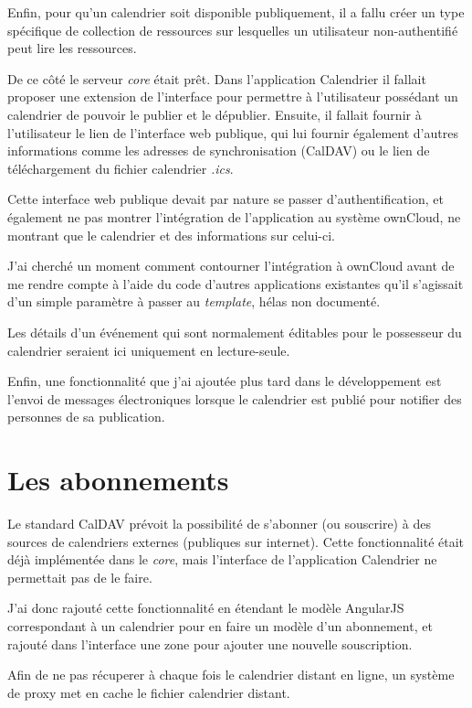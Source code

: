 \documentclass[10pt,a4paper]{report}
\begin{document}
	Enfin, pour qu'un calendrier soit disponible publiquement, il a fallu créer un type spécifique de collection de ressources sur lesquelles un utilisateur non-authentifié peut lire les ressources.
	
	De ce côté le serveur \textit{core} était prêt. Dans l'application Calendrier il fallait proposer une extension de l'interface pour permettre à l'utilisateur possédant un calendrier de pouvoir le publier et le dépublier. Ensuite, il fallait fournir à l'utilisateur le lien de l'interface web publique, qui lui fournir également d'autres informations comme les adresses de synchronisation (CalDAV) ou le lien de téléchargement du fichier calendrier \textit{.ics}.
	
	Cette interface web publique devait par nature se passer d'authentification, et également ne pas montrer l'intégration de l'application au système ownCloud, ne montrant que le calendrier et des informations sur celui-ci.
	
	J'ai cherché un moment comment contourner l'intégration à ownCloud avant de me rendre compte à l'aide du code d'autres applications existantes qu'il s'agissait d'un simple paramètre à passer au \textit{template}, hélas non documenté.
	
	Les détails d'un événement qui sont normalement éditables pour le possesseur du calendrier seraient ici uniquement en lecture-seule.
	
	Enfin, une fonctionnalité que j'ai ajoutée plus tard dans le développement est l'envoi de messages électroniques lorsque le calendrier est publié pour notifier des personnes de sa publication.
	
	\section{Les abonnements}
	Le standard CalDAV prévoit la possibilité de s'abonner (ou souscrire) à des sources de calendriers externes (publiques sur internet). Cette fonctionnalité était déjà implémentée dans le \textit{core}, mais l'interface de l'application Calendrier ne permettait pas de le faire. 
	
	J'ai donc rajouté cette fonctionnalité en étendant le modèle AngularJS correspondant à un calendrier pour en faire un modèle d'un abonnement, et rajouté dans l'interface une zone pour ajouter une nouvelle souscription. 
	
	Afin de ne pas récuperer à chaque fois le calendrier distant en ligne, un système de proxy met en cache le fichier calendrier distant.
	
\end{document}
